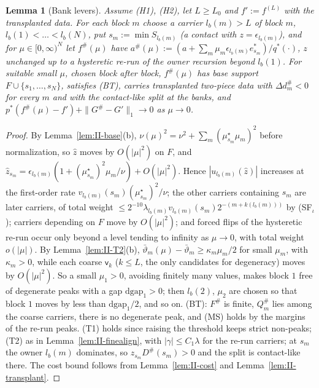 \documentclass[10pt]{amsart}
\newtheorem{lemma}[theorem]{Lemma}
\theoremstyle{definition}
\theoremstyle{remark}
\newcommand{\zh}{\hat z}
\begin{document}
\begin{lemma}[Bank levers]\label{lem:II-banklever}
Assume \textup{(H1)}, \textup{(H2)}, let $L\ge L_0$ and $f':=f^{(L)}$ with the
transplanted data.  For each block $m$ choose a carrier $l_b(m)>L$ of block $m$,
$l_b(1)<\dots<l_b(N)$, put $s_m:=\min S_{l_b(m)}$ \textup{(}a contact with
$z=\epsilon_{l_b(m)}$\textup{)}, and for $\mu\in[0,\infty)^N$ let $f^\#(\mu)$ have
$a^\#(\mu):=(a+\sum_m\mu_m\epsilon_{l_b(m)}e^*_{s_m})/q^*(\cdot)$, $z$ unchanged up to a
hysteretic re-run of the owner recursion beyond $l_b(1)$.  For suitable small
$\mu$, chosen block after block, $f^\#(\mu)$ has base support $F\cup\{s_1,\dots,
s_N\}$, satisfies \textup{(BT)}, carries transplanted two-piece data with $\Delta
d^\#_m<0$ for every $m$ and with the contact-like split at the banks, and
$p^*(f^\#(\mu)-f')+\|G^\#-G'\|_1\to0$ as $\mu\to0$.
\end{lemma}

\begin{proof}
By Lemma~\ref{lem:II-base}(b), $\nu(\mu)^2=\nu^2+\sum_m(\mu^\star_{s_m}\mu_m)^2$ before
normalization, so $\zh$ moves by $O(|\mu|^2)$ on $F$, and $\zh_{s_m}=\epsilon_{l_b(m)}
(1+(\mu^\star_{s_m})^2\mu_m/\nu)+O(|\mu|^2)$.  Hence $|u_{l_b(m)}(\zh)|$ increases at the
first-order rate $v_{l_b(m)}(s_m)(\mu^\star_{s_m})^2/\nu$; the other carriers containing
$s_m$ are later carriers, of total weight $\le2^{-10}\lambda_{l_b(m)}v_{l_b(m)}(s_m)
2^{-(m+k(l_b(m)))}$ by (SF$_\iota$); carriers depending on $F$ move by
$O(|\mu|^2)$; and forced flips of the hysteretic re-run occur only beyond a
level tending to infinity as $\mu\to0$, with total weight $o(|\mu|)$.  By
Lemma~\ref{lem:II-T2}(b), $\bar\vartheta_m(\mu)-\bar\vartheta_m\ge\kappa_m\mu_m/2$ for
small $\mu_m$, with $\kappa_m>0$, while each coarse $\mathsf v_k$ ($k\le L$, the
only candidates for degeneracy) moves by $O(|\mu|^2)$.  So a small $\mu_1>0$,
avoiding finitely many values, makes block $1$ free of degenerate peaks with
a gap $\mathrm{dgap}_1>0$; then $l_b(2)$, $\mu_2$ are chosen so that block $1$ moves
by less than $\mathrm{dgap}_1/2$, and so on.  (BT): $F^\#$ is finite, $Q^\#_m$ lies
among the coarse carriers, there is no degenerate peak, and (MS) holds by the
margins of the re-run peaks.  (T1) holds since raising the threshold keeps
strict non-peaks; (T2) as in Lemma~\ref{lem:II-finealign}, with
$|\gamma|\le C_1\lambda$ for the re-run carriers; at $s_m$ the owner $l_b(m)$
dominates, so $z_{s_m}D^\#(s_m)>0$ and the split is contact-like there.  The
cost bound follows from Lemma~\ref{lem:II-cost} and
Lemma~\ref{lem:II-transplant}.
\end{proof}
\end{document}
